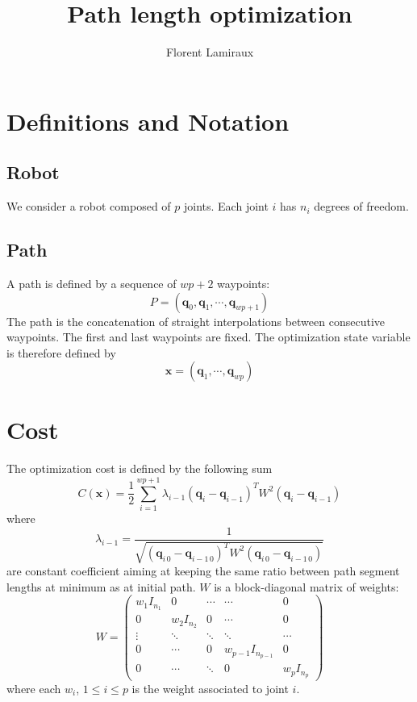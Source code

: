 \documentclass {article}
\title {Path length optimization}
\author {Florent Lamiraux}
\newcommand\cost{C}
\newcommand\path{P}
\newcommand\state{\mathbf{x}}
\newcommand\conf{\textbf{q}}
\newcommand\weight{W}
\begin{document}
\maketitle
\section {Definitions and Notation}

\subsection {Robot}
We consider a robot composed of $p$ joints. Each joint $i$ has $n_i$ degrees of freedom.

\subsection {Path}

A path is defined by a sequence of $wp+2$ waypoints:
\begin{equation}\label{eq:def-path}
  \path = (\conf_0,\conf_1,\cdots,\conf_{wp+1})
\end{equation}
The path is the concatenation of straight interpolations between consecutive waypoints.
The first and last waypoints are fixed. The optimization state variable is therefore defined by
\begin{equation}\label{eq:def-state}
  \state = (\conf_1,\cdots,\conf_{wp})
\end{equation}

\section {Cost}

The optimization cost is defined by the following sum
\begin{equation}\label{eq:def-cost}
  \cost (\state) = \frac{1}{2}\sum_{i=1}^{wp+1} \lambda_{i-1} (\conf_{i}-\conf_{i-1})^T \weight^2 (\conf_{i}-\conf_{i-1})
\end{equation}
where
$$
\lambda_{i-1} = \frac{1}{\sqrt{(\conf_{i\,0}-\conf_{i-1\,0})^T \weight^2 (\conf_{i\,0}-\conf_{i-1\,0})}}
$$
are constant coefficient aiming at keeping the same ratio between path segment lengths at minimum as at initial path.
$\weight$ is a block-diagonal matrix of weights:
\begin{equation}\label{def-weight}
W = \left(\begin{array}{ccccc}
w_1 I_{n_1} & 0 & \cdots & \cdots & 0 \\
0 & w_2 I_{n_2} & 0 & \cdots & 0 \\
\vdots & \ddots & \ddots & \ddots & \cdots \\
0 & \cdots & 0 & w_{p-1} I_{n_{p-1}} & 0 \\
0 & \cdots & \ddots & 0 & w_p I_{n_p}
\end{array}\right)
\end{equation}
where each $w_i$, $1 \leq i \leq p$ is the weight associated to joint $i$.
\end{document}
